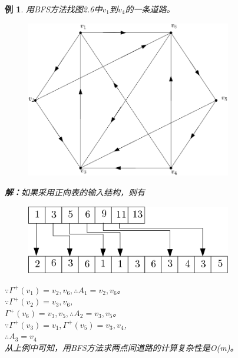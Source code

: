 \documentclass[11pt,a4paper,openany]{book}
\newtheorem{sample}{\textbf{例}}[section]
\begin{document}
\begin{sample}
用BFS方法找图2.6中$v_1$到$v_4$的一条道路。\\
\begin{figure}[!ht]
  \centering
  \includegraphics[width=0.8\textwidth]{2.6.png}\\
  \caption{}\label{fig:2.6}
\end{figure}
\textbf{解：}如果采用正向表的输入结构，则有\\
\begin{figure}[h]
  \centering
   \vspace{-10pt}
  \includegraphics[width=0.8\textwidth]{2.6BFS.png}\\
  \caption*{}\label{} \vspace{-40pt}
\end{figure}
$\because \Gamma^{+}(v_1)={v_2,v_6},\therefore A_1={v_2,v_6}$。\\
$\because \Gamma^{+}(v_2)={v_3,v_6}$,\\
$\Gamma^{+}(v_6)={v_3,v_5},\therefore A_2={v_3,v_5}$。\\
$\because  \Gamma^{+}(v_3)={v_1},\Gamma^{+}(v_5)={v_3,v_4}$,\\
$\therefore A_3={v_4}$\\
\indent 从上例中可知，用BFS方法求两点间道路的计算复杂性是O(m)。
\end{sample}
\end{document}
